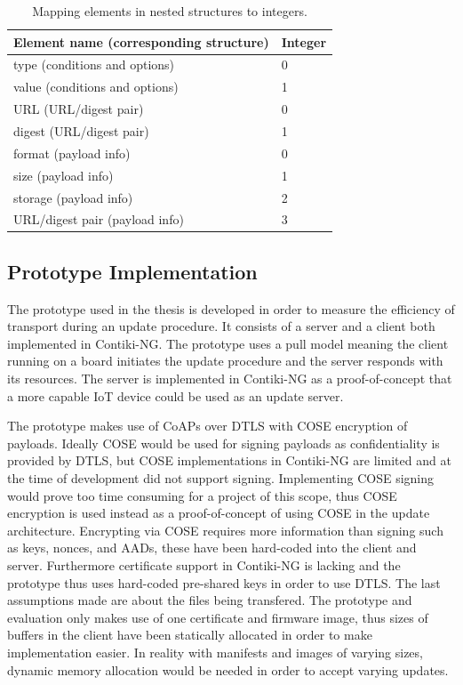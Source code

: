 \documentclass[0-thesis.tex]{subfiles}
\begin{document}
\begin{longtable}[]{@{}ll@{}}
    \caption{Mapping elements in nested structures to integers.}
    \label{tab:nested-substitution}\\
    \toprule
    Element name (corresponding structure) & Integer\tabularnewline
    \midrule
    \endhead
    type (conditions and options) & 0\tabularnewline
    value (conditions and options) & 1\tabularnewline
    \bottomrule
    URL (URL/digest pair) & 0\tabularnewline
    digest (URL/digest pair) & 1\tabularnewline
    \bottomrule
    format (payload info) & 0\tabularnewline
    size (payload info) & 1\tabularnewline
    storage (payload info) & 2\tabularnewline
    URL/digest pair (payload info) & 3\tabularnewline
    \bottomrule
\end{longtable}



\subsection{Prototype Implementation}
\label{ssec:prototype-implementation}
The prototype used in the thesis is developed in order to measure the efficiency of
transport during an update procedure. It consists of a server and a client both
implemented in Contiki-NG. The prototype uses a pull model meaning the client running on a
board initiates the update procedure and the server responds with its resources. The
server is implemented in Contiki-NG as a proof-of-concept that a more capable IoT device
could be used as an update server.

The prototype makes use of CoAPs over DTLS with COSE encryption of payloads. Ideally COSE
would be used for signing payloads as confidentiality is provided by DTLS, but COSE
implementations in Contiki-NG are limited and at the time of development did not support
signing. Implementing COSE signing would prove too time consuming for a project of this
scope, thus COSE encryption is used instead as a proof-of-concept of using COSE in the
update architecture. Encrypting via COSE requires more information than signing such as
keys, nonces, and AADs, these have been hard-coded into the client and server. Furthermore
certificate support in Contiki-NG is lacking and the prototype thus uses hard-coded
pre-shared keys in order to use DTLS. The last assumptions made are about the files being
transfered. The prototype and evaluation only makes use of one certificate and firmware
image, thus sizes of buffers in the client have been statically allocated in order to make
implementation easier. In reality with manifests and images of varying sizes, dynamic
memory allocation would be needed in order to accept varying updates.
\end{document}
